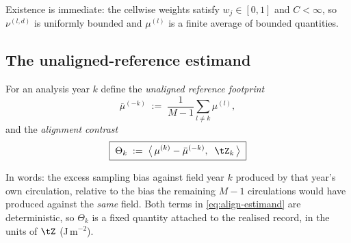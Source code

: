 \noindent
Existence is immediate: the cellwise weights satisfy $w_j \in [0,1]$ and $C < \infty$, so
$\nu^{(l,d)}$ is uniformly bounded and $\mu^{(l)}$ is a finite average of bounded quantities.

\subsection{The unaligned-reference estimand}
\label{sec:align-estimand}

\begin{definition}
\label{def:align}
For an analysis year $k$ define the \emph{unaligned reference footprint}
\begin{equation}
  \bar{\mu}^{(-k)} \;:=\; \frac{1}{M-1}\sum_{l \neq k} \mu^{(l)} ,
\end{equation}
and the \emph{alignment contrast}
\begin{equation}
  \label{eq:align-estimand}
  \boxed{\;\Theta_k \;:=\; \big\langle\, \mu^{(k)} - \bar{\mu}^{(-k)},\;\; \tZ_k \,\big\rangle \;}
\end{equation}
\end{definition}

\noindent
In words: the excess sampling bias against field year $k$ produced by that year's own circulation,
relative to the bias the remaining $M-1$ circulations would have produced against the \emph{same}
field. Both terms in \eqref{eq:align-estimand} are deterministic, so $\Theta_k$ is a fixed quantity
attached to the realised record, in the units of $\tZ$ (J\,m$^{-2}$).

